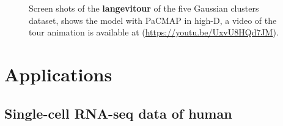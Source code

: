 \documentclass[
  12pt]{article}
\begin{document}
\begin{figure}[H]
\begin{minipage}{0.33\linewidth}
{}

\subcaption{\label{fig-gau5_sc2}}

\end{minipage}%
%
\begin{minipage}{0.33\linewidth}


\subcaption{\label{fig-gau5_sc3}}

\end{minipage}%

\caption{\label{fig-gau5_sc}Screen shots of the \textbf{langevitour} of
the five Gaussian clusters dataset, shows the model with PaCMAP in
high-D, a video of the tour animation is available at
(\url{https://youtu.be/UxvU8HQd7JM}).}

\end{figure}%

\section{Applications}\label{sec-applications}

\subsection{Single-cell RNA-seq data of
human}\label{single-cell-rna-seq-data-of-human}
\end{document}
